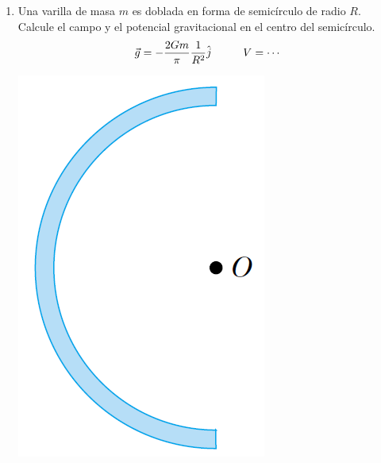 \documentclass[11pt,twocolumn]{article}
\begin{document}
\begin{enumerate}
\item Una varilla de masa $m$ es doblada en forma de semicírculo de radio $R$. Calcule el campo y el potencial gravitacional en el centro del semicírculo.
\begin{displaymath}
\vec{g}=-\dfrac{2Gm}{\pi}\dfrac{1}{R^2} \hat{j} \hspace{1.0 cm} V=\cdots
\end{displaymath} 
{
\begin{center}
\includegraphics[scale=0.2, angle=-90]{media-barilla}
\end{center}
}


\end{enumerate}
\end{document}
